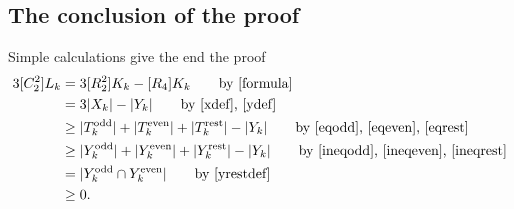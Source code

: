 \documentclass[submission]{FPSAC2021}
\DeclareMathOperator{\odd}{odd}
\DeclareMathOperator{\even}{even}
\DeclareMathOperator{\rest}{rest}
\begin{document}
\subsection{The conclusion of the proof}


Simple calculations give the end the proof
\begin{align*}
3[C_2^2]L_k & =3[R_2^2]K_k-[R_4]K_k \tag*{by \eqref{formula}}\\ 
& =3|X_k|-|Y_k| \tag*{by \eqref{xdef}, \eqref{ydef}}\\ 
& \geq |T_k^{\odd}|+|T_k^{\even}|+|T_k^{\rest}|-|Y_k| \tag*{by \eqref{eqodd},
\eqref{eqeven}, \eqref{eqrest}}\\ & \geq |Y_k^{\odd}|+|Y_k^{\even}|+|
Y_k^{\rest}|-|Y_k| \tag*{by \eqref{ineqodd}, \eqref{ineqeven}, \eqref{ineqrest}}\\
& =|Y_k^{\odd} \cap Y_k^{\even}| \tag*{by \eqref{yrestdef}}\\ 
& \geq 0.
\end{align*}
\printbibliography 
\end{document}
